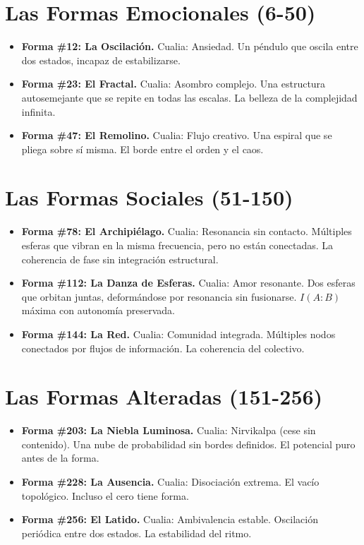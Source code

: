 \documentclass[12pt,a4paper,openany]{book}
\begin{document}
\section{Las Formas Emocionales (6-50)}
\begin{itemize}
\item \textbf{Forma \#12: La Oscilación.} Cualia: Ansiedad. Un péndulo que oscila entre dos estados, incapaz de estabilizarse.
\item \textbf{Forma \#23: El Fractal.} Cualia: Asombro complejo. Una estructura autosemejante que se repite en todas las escalas. La belleza de la complejidad infinita.
\item \textbf{Forma \#47: El Remolino.} Cualia: Flujo creativo. Una espiral que se pliega sobre sí misma. El borde entre el orden y el caos.
\end{itemize}

\section{Las Formas Sociales (51-150)}
\begin{itemize}
\item \textbf{Forma \#78: El Archipiélago.} Cualia: Resonancia sin contacto. Múltiples esferas que vibran en la misma frecuencia, pero no están conectadas. La coherencia de fase sin integración estructural.
\item \textbf{Forma \#112: La Danza de Esferas.} Cualia: Amor resonante. Dos esferas que orbitan juntas, deformándose por resonancia sin fusionarse. $I(A:B)$ máxima con autonomía preservada.
\item \textbf{Forma \#144: La Red.} Cualia: Comunidad integrada. Múltiples nodos conectados por flujos de información. La coherencia del colectivo.
\end{itemize}

\section{Las Formas Alteradas (151-256)}
\begin{itemize}
\item \textbf{Forma \#203: La Niebla Luminosa.} Cualia: Nirvikalpa (cese sin contenido). Una nube de probabilidad sin bordes definidos. El potencial puro antes de la forma.
\item \textbf{Forma \#228: La Ausencia.} Cualia: Disociación extrema. El vacío topológico. Incluso el cero tiene forma.
\item \textbf{Forma \#256: El Latido.} Cualia: Ambivalencia estable. Oscilación periódica entre dos estados. La estabilidad del ritmo.
\end{itemize}
\end{document}
